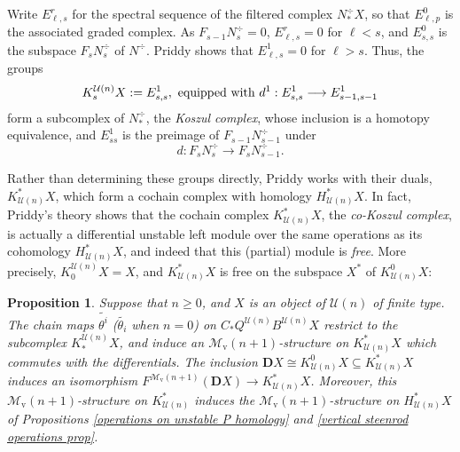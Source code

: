 \documentclass[11pt]{amsart} \renewcommand{\baselinestretch}{1.2}
\theoremstyle{plain}
\newtheorem{prop}[thm]{Proposition}
\numberwithin{equation}{section} %
\theoremstyle{plain}
\newtheorem{prop}[thm]{Proposition}
\numberwithin{equation}{chapter} %
\renewcommand{\to}{\longrightarrow}
\newcommand{\calU}{\mathcal{U}}
\newcommand{\calMv}{\mathcal{M}\dver}
\newcommand{\Nop}{N^{\smash{-}}}
\newcommand{\dver}{_\mathrm{v}}
\newcommand{\dual}{\mathbf{D}}
\begin{document}
\begin{Koszul complexes}
Write $E^r_{\ell,s}$ for the spectral sequence of the filtered complex $N^\div_*X$, so that $E^0_{\ell,p}$ is the associated graded complex. As $F_{s-1} N^\div_s=0$, $E^r_{\ell,s}=0$ for $\ell<s$, and $E^0_{s,s}$ is the subspace $F_sN^\div_s$ of $N^\div$. %
Priddy \cite[Proof of Theorem 5.3]{PriddyKoszul.pdf} shows that $E^1_{\ell,s}=0$  for $\ell>s$. Thus, the groups
\[K_s^{\calU(n)}X:=E^1_{s,s}, \textup{ equipped with $d^1:E^1_{s,s}\to E^1_{s-1,s-1}$}\]
form a subcomplex of $N^\div_*$, the \emph{Koszul complex}, whose inclusion is a homotopy equivalence, and $E^1_{ss}$ is the preimage of $F_{s-1}N^\div_{s-1}$ under
\[d:F_{s}N^\div_{s}\to F_{s}N^\div_{s-1}.\]


Rather than determining these groups directly, Priddy works with their duals, $K^*_{\calU(n)}X$, which form a cochain complex with homology $H^*_{\calU(n)}X$. In fact, Priddy's theory shows that the cochain complex $K^*_{\calU(n)}X$, the \emph{co-Koszul complex}, is actually a differential unstable left module over the same operations as its cohomology $H^*_{\calU(n)}X$, and indeed that this (partial) module is \emph{free}. More precisely,  $K_0^{\calU(n)}X= X$, and $K^*_{\calU(n)}X$ is free on the  subspace $X^*$ of $K^0_{\calU(n)}X$:
\begin{prop}
\label{the cokoszul complex is free}
Suppose that $n\geq0$, and $X$ is an object of $\calU(n)$ of finite type. The chain maps $\widetilde{\theta^i}$  ($\widetilde{\theta_i}$ when $n=0$) on $C_*Q^{\calU(n)}B^{\calU(n)}X$ restrict to the subcomplex $K_*^{\calU(n)}X$, and induce an $\calMv(n+1)$-structure on $K^*_{\calU(n)}X$ which commutes with the differentials. The inclusion $\dual X\cong K^0_{\calU(n)}X\subseteq K^*_{\calU(n)}X$ induces an isomorphism $F^{\calMv(n+1)}(\dual X)\to K^*_{\calU(n)}X$. Moreover, this $\calMv(n+1)$-structure on $K^*_{\calU(n)}$ induces the $\calMv(n+1)$-structure on $H^*_{\calU(n)}X$ of Propositions \ref{operations on unstable P homology} and \ref{vertical steenrod operations prop}.
\end{prop}



\end{Koszul complexes}
\end{document}

